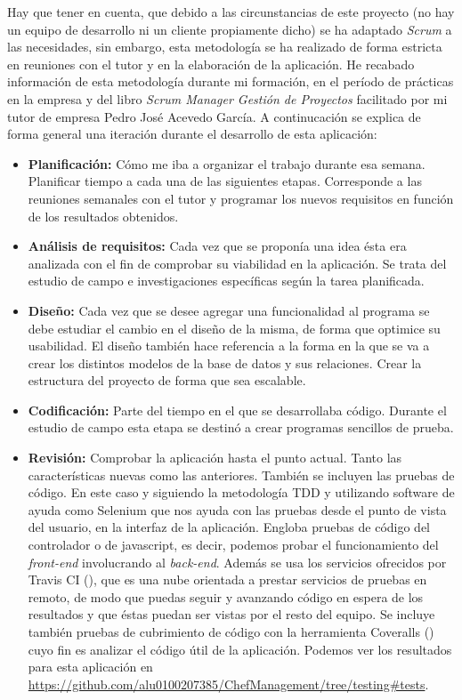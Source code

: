Hay que tener en cuenta, que debido a las circunstancias de este proyecto (no hay un equipo de desarrollo ni un cliente propiamente dicho) se ha adaptado \emph{Scrum} a las necesidades, sin embargo, esta metodología se ha realizado de forma estricta en reuniones con el tutor y en la elaboración de la aplicación. He recabado información de esta metodología durante mi formación, en el período de prácticas en la empresa y del libro \emph{Scrum Manager Gestión de Proyectos} \cite{LibroScrum} facilitado por mi tutor de empresa Pedro José Acevedo García. A continucación se explica de forma general una iteración durante el desarrollo de esta aplicación:
\begin{itemize}
	\item \textbf{Planificación:} Cómo me iba a organizar el trabajo durante esa semana. Planificar tiempo a cada una de las siguientes etapas. Corresponde a las reuniones semanales con el tutor y programar los nuevos requisitos en función de los resultados obtenidos.
	\item \textbf{Análisis de requisitos:} Cada vez que se proponía una idea ésta era analizada con el fin de comprobar su viabilidad en la aplicación. Se trata del estudio de campo e investigaciones específicas según la tarea planificada.
	\item \textbf{Diseño:} Cada vez que se desee agregar una funcionalidad al programa se debe estudiar el cambio en el diseño de la misma, de forma que optimice su usabilidad. El diseño también hace referencia a la forma en la que se va a crear los distintos modelos de la base de datos y sus relaciones. Crear la estructura del proyecto de forma que sea escalable.
	\item \textbf{Codificación:} Parte del tiempo en el que se desarrollaba código. Durante el estudio de campo esta etapa se destinó a crear programas sencillos de prueba.
	\item \textbf{Revisión:} Comprobar la aplicación hasta el punto actual. Tanto las características nuevas como las anteriores. También se incluyen las pruebas de código. En este caso y siguiendo la metodología TDD y utilizando software de ayuda como Selenium que nos ayuda con las pruebas desde el punto de vista del usuario, en la interfaz de la aplicación. Engloba pruebas de código del controlador o de javascript, es decir, podemos probar el funcionamiento del \emph{front-end} involucrando al \emph{back-end}. Además se usa los servicios ofrecidos por Travis CI (\cite{URL:Travis}), que es una nube orientada a prestar servicios de pruebas en remoto, de modo que puedas seguir y avanzando código en espera de los resultados y que éstas puedan ser vistas por el resto del equipo. Se incluye también pruebas de cubrimiento de código con la herramienta Coveralls (\cite{URL:Coveralls}) cuyo fin es analizar el código útil de la aplicación. Podemos ver los resultados para esta aplicación en \href{https://github.com/alu0100207385/ChefManagement/tree/testing#tests}{https://github.com/alu0100207385/ChefManagement/tree/testing\#tests}.

\end{itemize}
